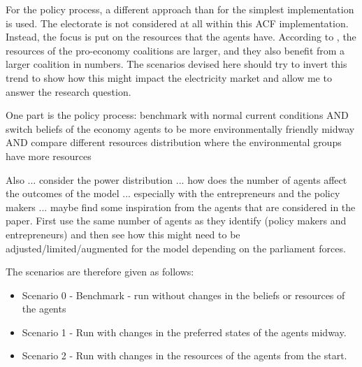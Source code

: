 \documentclass[12pt]{article}
\begin{document}
For the policy process, a different approach than for the simplest implementation is used. The electorate is not considered at all within this ACF implementation. Instead, the focus is put on the resources that the agents have. According to \cite{markard2016socio}, the resources of the pro-economy coalitions are larger, and they also benefit from a larger coalition in numbers. The scenarios devised here should try to invert this trend to show how this might impact the electricity market and allow me to answer the research question.

One part is the policy process: benchmark with normal current conditions AND switch beliefs of the economy agents to be more environmentally friendly midway AND compare different resources distribution where the environmental groups have more resources

Also ... consider the power distribution ... how does the number of agents affect the outcomes of the model ... especially with the entrepreneurs and the policy makers ... maybe find some inspiration from the agents that are considered in the \cite{markard2016socio} paper. First use the same number of agents as they identify (policy makers and entrepreneurs) and then see how this might need to be adjusted/limited/augmented for the model depending on the parliament forces.

The scenarios are therefore given as follows:

\begin{itemize}
\item Scenario 0 - Benchmark - run without changes in the beliefs or resources of the agents
\item Scenario 1 - Run with changes in the preferred states of the agents midway.
\item Scenario 2 - Run with changes in the resources of the agents from the start.
\end{itemize}
\end{document}

